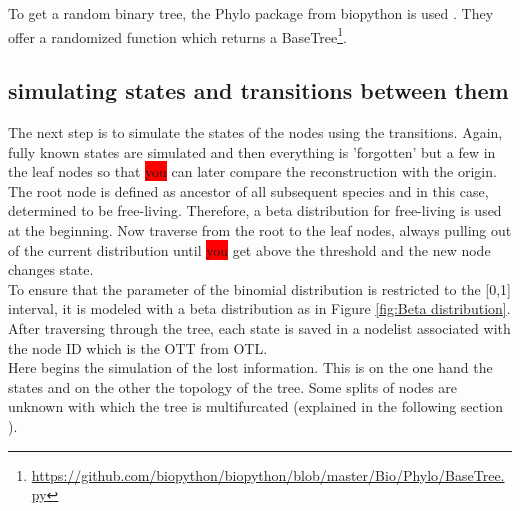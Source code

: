       To get a random binary tree, the Phylo package from biopython is used \cite{Cock2009}. They offer 
        a randomized function which returns a BaseTree\footnote{
          \hyperlink{https://github.com/biopython/biopython/blob/master/Bio/Phylo/BaseTree.py}
          {https://github.com/biopython/biopython/blob/master/Bio/Phylo/BaseTree.py}
        }. \\

    \subsection{simulating states and transitions between them}
      The next step is to simulate the states of the nodes using the transitions. Again, fully known 
        states are simulated and then everything is 'forgotten' but a few in the leaf nodes so that 
        \colorbox{red}{you} can later compare the reconstruction with the origin. \\
      The root node is defined as ancestor of all subsequent species and in this case, determined to be
        free-living. Therefore, a beta distribution for free-living is used at the beginning. Now 
        traverse from the root to the leaf nodes, always pulling out of the current distribution until 
        \colorbox{red}{you} get above the threshold and the new node changes state.  \\
      To ensure that the parameter of the binomial distribution is restricted to the [0,1] interval, it 
        is modeled with a beta distribution as in Figure \ref{fig:Beta distribution}. \\

      After traversing through the tree, each state is saved in a nodelist associated with the node ID 
        which is the OTT from OTL. \\

      Here begins the simulation of the lost information. This is on the one hand the states and on the 
        other the topology of the tree. Some splits of nodes are unknown with which the tree is 
        multifurcated (explained in the following section ). \\

